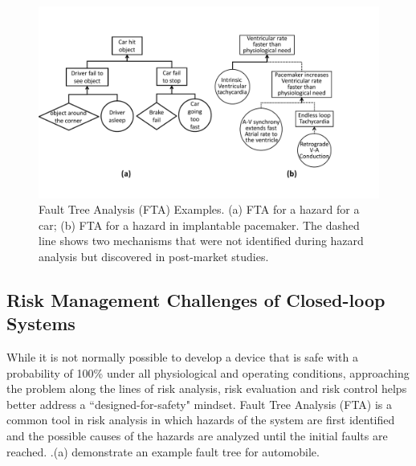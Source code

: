 \begin{figure}[t]
		\centering
		\includegraphics[width=\textwidth]{figs/fta_new.pdf}
		\caption{\small Fault Tree Analysis (FTA) Examples. (a) FTA for a hazard for a car; (b) FTA for a hazard in implantable pacemaker. The dashed line shows two mechanisms that were not identified during hazard analysis but discovered in post-market studies.}
		\label{fig:risks}
\end{figure}
\subsection{Risk Management Challenges of Closed-loop Systems}
While it is not normally possible to develop a device that is safe with a probability of 100\% under all physiological and operating conditions, approaching the problem along the lines of risk analysis, risk evaluation and risk control helps better address a ``designed-for-safety" mindset. Fault Tree Analysis (FTA) is a common tool in risk analysis in which hazards of the system are first identified and the possible causes of the hazards are analyzed until the initial faults are reached. .(a) demonstrate an example fault tree for automobile. %

